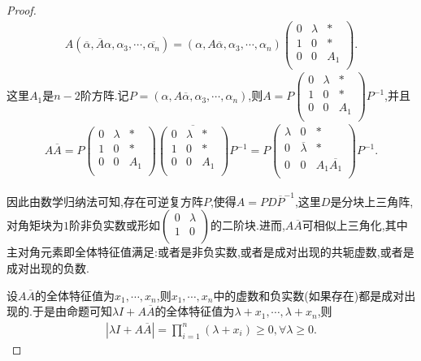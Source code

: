 \documentclass[../../main.tex]{subfiles}%
\begin{document}
\begin{proof}
\begin{align*}
A\left( \overline{\alpha },\overline{A}\alpha ,\alpha _3,\cdots ,\overline{\alpha _n} \right) =\left( \alpha ,A\overline{\alpha },\alpha _3,\cdots ,\alpha _n \right) \begin{pmatrix}
0&		\lambda&		*\\
1&		0&		*\\
0&		0&		A_1\\
\end{pmatrix}.
\end{align*}
这里$A_1$是$n-2$阶方阵.记$P=\left( \alpha ,A\overline{\alpha },\alpha _3,\cdots ,\alpha _n \right)$,则$A=P\begin{pmatrix}
0&		\lambda&		*\\
1&		0&		*\\
0&		0&		A_1\\
\end{pmatrix} P^{-1}$,并且
\begin{align*}
A\overline{A}=P\begin{pmatrix}
0&		\lambda&		*\\
1&		0&		*\\
0&		0&		A_1\\
\end{pmatrix} \overline{\begin{pmatrix}
0&		\lambda&		*\\
1&		0&		*\\
0&		0&		A_1\\
\end{pmatrix} }P^{-1}=P\begin{pmatrix}
\lambda&		0&		*\\
0&		\overline{\lambda }&		*\\
0&		0&		A_1\overline{A_1}\\
\end{pmatrix} P^{-1}.
\end{align*}

因此由数学归纳法可知,存在可逆复方阵$P$,使得$A=PD\overline{P}^{-1}$,这里$D$是分块上三角阵,对角矩块为$1$阶非负实数或形如$\begin{pmatrix}
0&		\lambda\\
1&		0\\
\end{pmatrix}$的二阶块.进而,$A\overline{A}$可相似上三角化,其中主对角元素即全体特征值满足:或者是非负实数,或者是成对出现的共轭虚数,或者是成对出现的负数.

设$A\overline{A}$的全体特征值为$x_1,\cdots ,x_n$,则$x_1,\cdots ,x_n$中的虚数和负实数(如果存在)都是成对出现的.于是由命题可知$\lambda I+A\overline{A}$的全体特征值为$\lambda +x_1,\cdots ,\lambda +x_n$,则
\begin{align*}
\left| \lambda I+A\overline{A} \right|=\prod_{i=1}^n{\left( \lambda +x_i \right)}\geqslant 0,\forall \lambda \geqslant 0.
\end{align*}
\end{proof}
\end{document}
